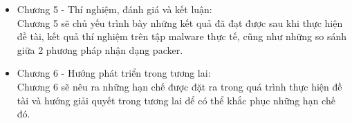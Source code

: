 \begin{itemize}
\item{Chương 5 - Thí nghiệm, đánh giá và kết luận:\\
\hspace*{0.5cm}Chương 5 sẽ chủ yếu trình bày những kết quả đã đạt được sau khi thực hiện đề tài, kết quả thí nghiệm trên tập malware thực tế, cũng như những so sánh giữa 2 phương pháp nhận dạng packer.\\}
\item{Chương 6 - Hướng phát triển trong tương lai:\\
\hspace*{0.5cm}Chương 6 sẽ nêu ra những hạn chế được đặt ra trong quá trình thực hiện đề tài và hướng giải quyết trong tương lai để có thể khắc phục những hạn chế đó.}
\end{itemize}
